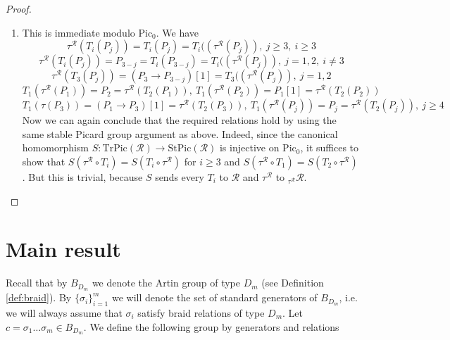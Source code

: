 \documentclass[12pt]{amsart}
\theoremstyle{plain}
\theoremstyle{remark}
\theoremstyle{definition}
\newcommand{\Pic}{{\mathrm{Pic}}}
\newcommand{\TrPic}{{\mathrm{TrPic}}}
\newcommand{\StPic}{{\mathrm{StPic}}}
\begin{document}
\begin{proof}
\begin{enumerate}
$$\Omega^{2m-3}_{\mathcal{R}_m \otimes \mathcal{R}^{op}_m} (\mathcal{R}_m) \cong M \otimes_{\Lambda_m} \Omega^{2m-3}_{\Lambda_m \otimes \Lambda^{op}_m} (\Lambda_m) \otimes_{\Lambda_m} N \cong M \otimes_{\Lambda_m} {}_{f_{-1}} \Lambda_m \otimes_{\Lambda_m} N \cong {}_{g_{-1}}\mathcal{R}_m $$
if $m$ is even, and 
$$\Omega^{2m-3}_{\mathcal{R}_m \otimes \mathcal{R}^{op}_m} (\mathcal{R}_m) \cong M \otimes_{\Lambda_m} \Omega^{2m-3}_{{\Lambda_m} \otimes {\Lambda^{op}_m}} (\Lambda) \otimes_{\Lambda_m} N \cong M \otimes_{\Lambda_m} {}_{f_{-1}\circ \tau^{\Lambda}} \Lambda_m \otimes_{\Lambda_m} N \cong  {}_{g_{-1}\circ \tau^{\mathcal{R}}}\mathcal{R}_m$$ 
if $m$ is odd. This finishes the proof. 
\item This is immediate modulo $\Pic_0$. We have
$$ \tau^\mathcal{R}(T_i(P_j)) = T_i(P_j) = T_i((\tau^\mathcal{R}(P_j)), \ j \geq 3, \ i \geq 3 $$
$$ \tau^\mathcal{R}(T_i(P_j)) = P_{3-j} =T_i(P_{3-j}) = T_i((\tau^\mathcal{R}(P_j)), \ j = 1,2, \ i \neq 3$$
$$ \tau^\mathcal{R}(T_3(P_j)) = (P_3 \xrightarrow{} P_{3-j})[1] = T_3((\tau^\mathcal{R}(P_j)), \ j = 1,2 $$ 
$$T_1(\tau^{\mathcal{R}}(P_1)) = P_2 = \tau^{\mathcal{R}}(T_2(P_1)),\  T_1(\tau^{\mathcal{R}}(P_2)) = P_1[1] = \tau^{\mathcal{R}}(T_2(P_2)) $$ $$ 
T_1(\tau(P_3)) = (P_1 \xrightarrow{} P_3)[1] = \tau^{\mathcal{R}}(T_2(P_3)), \ T_1(\tau^{\mathcal{R}}(P_j)) = P_j = \tau^{\mathcal{R}}(T_2(P_j)), \ j \geq 4 $$
Now we can again conclude that the required relations hold by using the same stable Picard group argument as above. Indeed, since the canonical homomorphism ${S \colon \TrPic(\mathcal{R}) \to \StPic(\mathcal{R})}$ is injective on $\Pic_0$, it suffices to show that $S(\tau^{\mathcal{R}} \circ T_i) = S( T_i \circ \tau^{\mathcal{R}})$ for $i \geq 3$ and $S(\tau^\mathcal{R} \circ T_1) = S(T_2 \circ \tau^\mathcal{R})$. But this is trivial, because $S$ sends every $T_i$ to $\mathcal{R}$ and $\tau^\mathcal{R}$ to ${}_{\tau^{\mathcal{R}}} \mathcal{R}$. 

\end{enumerate}
\end{proof} 

\section{Main result}\label{sec:mainres} 
 Recall that by $B_{D_m}$ we denote the Artin group of type $D_m$ (see Definition \ref{def:braid}). By $\{\sigma_i\}_{i=1}^m$ we will denote the set of standard generators of $B_{D_m}$, i.e. we will always assume that $\sigma_i$ satisfy braid relations of type $D_m$. Let $c =\sigma_1\dots\sigma_m \in B_{D_m}$. We define the following group by generators and relations 
\end{document}

